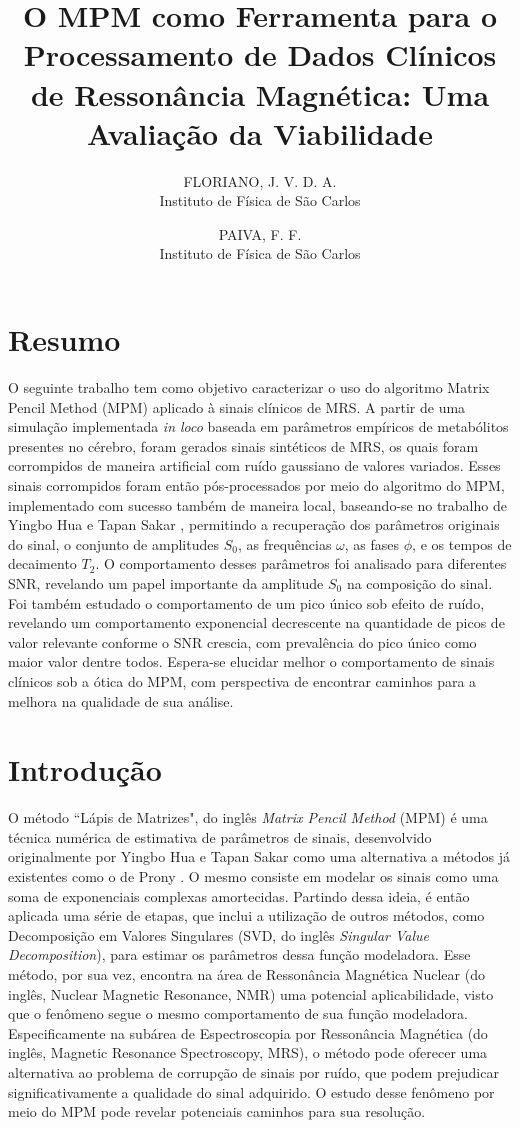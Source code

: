 \documentclass[12pt]{article}
\title{O MPM como Ferramenta para o Processamento de Dados Clínicos de Ressonância Magnética: Uma Avaliação da Viabilidade}
\author{FLORIANO, J. V. D. A. \\ Instituto de Física de São Carlos \and PAIVA, F. F. \\ Instituto de Física de São Carlos}
\begin{document}
\maketitle

\section{Resumo}
O seguinte trabalho tem como objetivo caracterizar o uso do algoritmo Matrix Pencil Method (MPM) aplicado à sinais clínicos de MRS. 
A partir de uma simulação implementada \textit{in loco}  baseada em parâmetros empíricos de metabólitos presentes no cérebro, foram gerados 
sinais sintéticos de MRS, os quais foram corrompidos de maneira artificial com ruído gaussiano de valores variados. Esses sinais 
corrompidos foram então pós-processados por meio do algoritmo do MPM, implementado com sucesso também de maneira local, baseando-se 
no trabalho de Yingbo Hua e Tapan Sakar \cite{370583}, permitindo a recuperação dos parâmetros originais do sinal, o conjunto de 
amplitudes $S_0$, as frequências $\omega$, as fases $\phi$, e os tempos de decaimento $T_2$. O comportamento desses parâmetros foi analisado 
para diferentes SNR, revelando um papel importante da amplitude $S_0$ na composição do sinal. Foi também estudado o comportamento de 
um pico único sob efeito de ruído, revelando um comportamento exponencial decrescente na quantidade de picos de valor relevante 
conforme o SNR crescia, com prevalência do pico único como maior valor dentre todos. Espera-se elucidar melhor o comportamento de 
sinais clínicos sob a ótica do MPM, com perspectiva de encontrar caminhos para a melhora na qualidade de sua análise.

\section{Introdução}
O método “Lápis de Matrizes", do inglês \textit{Matrix Pencil Method} (MPM) é uma técnica numérica de estimativa de parâmetros de 
sinais, desenvolvido originalmente por Yingbo Hua e Tapan Sakar \cite{370583} como uma alternativa a métodos já existentes como o 
de Prony \cite{49090}. O mesmo consiste em modelar os sinais como uma soma de exponenciais complexas amortecidas. Partindo dessa 
ideia, é então aplicada uma série de etapas, que inclui a utilização de outros métodos, como Decomposição em Valores Singulares 
(SVD, do inglês \textit{Singular Value Decomposition}), para estimar os parâmetros dessa função modeladora. Esse método, por sua 
vez, encontra na área de Ressonância Magnética Nuclear (do inglês, Nuclear Magnetic Resonance, NMR) uma potencial aplicabilidade, 
visto que o fenômeno segue o mesmo comportamento de sua função modeladora. Especificamente na subárea de Espectroscopia por 
Ressonância Magnética (do inglês, Magnetic Resonance Spectroscopy, MRS), o método pode oferecer uma alternativa ao problema de 
corrupção de sinais por ruído, que podem prejudicar significativamente a qualidade do sinal adquirido. O estudo desse fenômeno 
por meio do MPM pode revelar potenciais caminhos para sua resolução.
\end{document}
